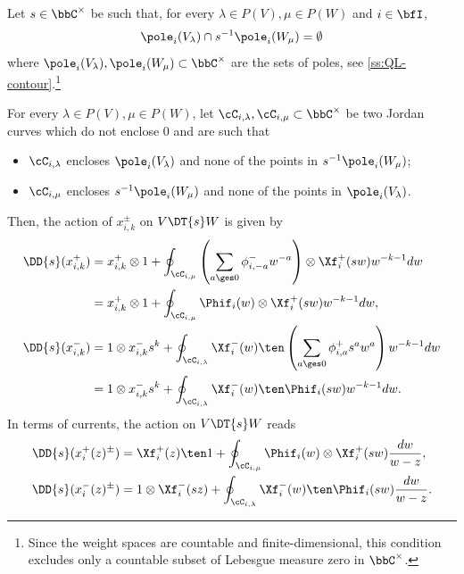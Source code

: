 \documentclass[reqno]{amsart}
\numberwithin{equation}{section}
\begin{document}
Let $s\in\bbC^\times$ be such that, for every $\lambda\in P(V), \mu\in P(W)$ and $i\in\bfI$, 
\begin{equation}
	\pole_i(V_{\lambda})\cap s^{-1}\pole_i(W_\mu)=\emptyset
\end{equation} 
where $\pole_i(V_\lambda), \pole_i(W_\mu)\subset\bbC^\times$ are the sets of poles, see \ref{ss:QL-contour}.\footnote{
Since the weight spaces are countable and finite-dimensional, this condition excludes only a countable subset of Lebesgue measure zero in $\bbC^\times$.}

For every $\lambda\in P(V), \mu\in P(W)$,
let $\cC_{i,\lambda},\cC_{i,\mu}\subset\bbC^\times$ be two Jordan curves which do not enclose $0$ and are such that
\begin{itemize}\itemsep0.25cm
	\item $\cC_{i,\lambda}$ encloses $\pole_i(V_\lambda)$ and none of the points in $s^{-1}\pole_i(W_\mu)$;
	\item $\cC_{i,\mu}$ encloses $s^{-1}\pole_i(W_\mu)$ and none of the points in $\pole_i(V_\lambda)$.
\end{itemize}
Then, the action of $x_{i,k}^\pm$ on $V\DT{s}W$ is given by
	\begin{equation}\label{eq:Drinfeld-gen-contour}
	\begin{split}
		\DD{s}(x_{i,k}^{+}) 
		&= x_{i,k}^{+} \otimes 1 + \oint_{\cC_{i,\mu}}
		\left(\sum_{a \ges 0} \phi_{i,-a}^{-}w^{-a} \right)\otimes \Xf_i^+(sw)w^{-k-1}dw \\
		&=x_{i,k}^{+} \otimes 1 + \oint_{\cC_{i,\mu}}\Phif_i(w)\otimes \Xf_i^+(sw)w^{-k-1}dw,\\ 
		\DD{s}(x_{i,k}^{-})
		&= 1\otimes x_{i,k}^{-} s^{k} + \oint_{\cC_{i,\lambda}}\Xf_i^-(w)\ten
		\left(\sum_{a \ges 0} \phi_{i,a}^{+} s^{a}w^a\right)
		w^{-k-1}dw\\
		&=1\otimes x_{i,k}^{-} s^{k} + \oint_{\cC_{i,\lambda}}\Xf_i^-(w)\ten\Phif_i(sw)w^{-k-1}dw.
	\end{split}
\end{equation}
In terms of currents, the action on $V\DT{s}W$ reads
\begin{equation}\label{eq:Drinfeld-current-contour}
	\begin{split}
		\DD{s}(x_{i}^{+}(z)^{\pm}) 
		&=\Xf_i^+(z)\ten 1 + \oint_{\cC_{i,\mu}}\Phif_i(w)\otimes \Xf_i^+(sw)
		\frac{dw}{w-z},\\ 
		\DD{s}(x_{i}^{-}(z)^{\pm})
		&=1\otimes \Xf_{i}^{-}(sz) + \oint_{\cC_{i,\lambda}}\Xf_i^-(w)\ten\Phif_i(sw)\frac{dw}{w-z}.\\
	\end{split}
\end{equation}
\end{document}
